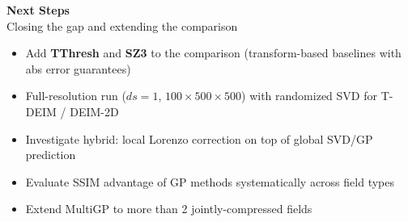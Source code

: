 \documentclass[aspectratio=169, 11pt]{beamer}
\begin{document}
\begin{frame}[standout]
  \large\textbf{Next Steps}\\[0.4em]
  \normalsize\textcolor{cteal!70!white}{Closing the gap and extending the comparison}

  \vspace{0.7em}
  \begin{itemize}\setlength\itemsep{0.45em}
    \item Add \textbf{TThresh} and \textbf{SZ3} to the comparison (transform-based baselines with abs error guarantees)
    \item Full-resolution run ($ds=1$, $100\times500\times500$) with randomized SVD for T-DEIM / DEIM-2D
    \item Investigate hybrid: local Lorenzo correction on top of global SVD/GP prediction
    \item Evaluate SSIM advantage of GP methods systematically across field types
    \item Extend MultiGP to more than 2 jointly-compressed fields
  \end{itemize}
\end{frame}

\end{document}
